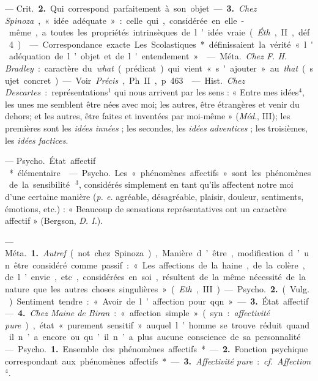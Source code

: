\begin{itemize}[leftmargin=1cm, label=, itemsep=1pt]
— \si{Crit.} {\bf 2.} Qui correspond parfaitement à son objet. — {\bf 3.} {\it Chez
Spinoza}, « idée adéquate » : celle qui,
considérée en elle-même, a toutes
les propriétés intrinsèques de l’idée
vraie ({\it Éth}., II, déf. 4).

 — Correspondance exacte.
Les Scolastiques* définissaient la
vérité « l'adéquation de l’objet et de
l'entendement ».

 — \si{Méta.} {\it Chez F. H. Bradley} :
caractère du {\it what} (prédicat) qui
vient « s'ajouter » au {\it that} (sujet concret). — Voir {\it Précis}, Ph. II, p. 463.

 — \si{Hist.} {\it Chez Descartes} : représentations$^1$ qui nous
arrivent par les sens : « Entre mes
idées$^4$, les unes me semblent être
nées avec moi; les autres, être étrangères et venir du dehors; et les
autres, être faites et inventées par
moi-même » ({\it Méd}., III); les premières sont les {\it idées innées} ; les
secondes, les {\it idées adventices} ; les
troisièmes, les {\it idées factices}.

 — \si{Psycho.} État affectif\,*
élémentaire.

 — \si{Psycho.} Les « phénomènes
affectifs » sont les phénomènes de la
sensibilité\,$^3$, considérés simplement
en tant qu'ils affectent notre moi
d’une certaine manière ({\it p. e.} agréable,
désagréable, plaisir, douleur, sentiments, émotions, etc.) : « Beaucoup
de sensations représentatives ont un
caractère affectif » (Bergson, {\it D. I.}).

 — \si{Méta.} {\bf 1.} {\it Autref}. (not.
chez Spinoza), Manière d’être, modification d’un être considéré comme
passif : « Les affections de la haine,
de la colère, de l’envie, etc., considérées en soi, résultent de la même
nécessité de la nature que les autres
choses singulières » ({\it Eth}., III).

— \si{Psycho.} {\bf 2.} (\si{Vulg.}) Sentiment
tendre : « Avoir de l’affection pour
qqn ». — {\bf 3.} État affectif. — {\bf 4.} {\it Chez
Maine de Biran} : « affection simple »
(syn. : {\it affectivité pure}), état « purement sensitif » auquel l’homme se
trouve réduit quand il n’a encore ou
qu’il n’a plus aucune conscience de
sa personnalité.

 — \si{Psycho.} {\bf 1.} Ensemble
des phénomènes affectifs*. — {\bf 2.}
Fonction psychique correspondant
aux phénomènes affectifs*. — {\bf 3.}
{\it Affectivité pure} : {\it cf.}  {\it Affection}$^4$.


\end{itemize}
